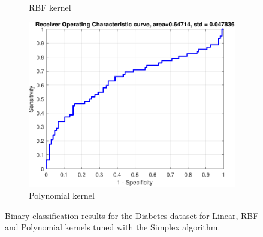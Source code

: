 \documentclass{article}
\begin{document}
\begin{figure}[H]
\begin{subfigure}[b]{0.3\textwidth}
                \caption{RBF kernel}
                 \label{fig:diabetes_rbf_roc}
             \end{subfigure}
             \hfill
             \begin{subfigure}[b]{0.3\textwidth}
                 \centering
                 \includegraphics[width=\textwidth]{Assignment 1/figures/diabetes_polynomial_classifier_roc.pdf}
                \caption{Polynomial kernel}
                 \label{fig:diabetes_poly_roc}
             \end{subfigure}
            \caption{Binary classification results for the Diabetes dataset for Linear, RBF and Polynomial kernels tuned with the Simplex algorithm.}
            \label{fig:diabetes_overall}
        \end{figure}
        
\end{document}
